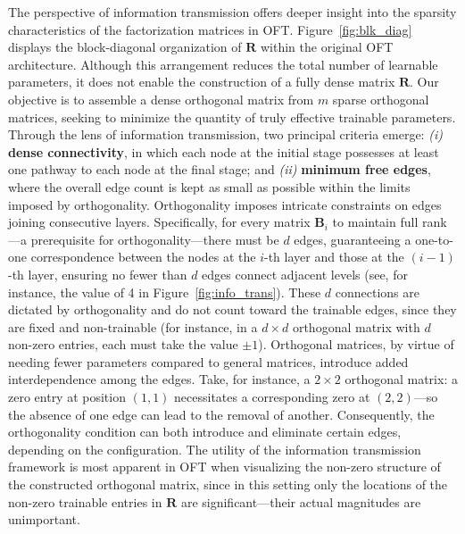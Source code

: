 The perspective of information transmission offers deeper insight into the sparsity characteristics of the factorization matrices in OFT. Figure~\ref{fig:blk_diag} displays the block-diagonal organization of $\bm{R}$ within the original OFT architecture. Although this arrangement reduces the total number of learnable parameters, it does not enable the construction of a fully dense matrix $\bm{R}$. Our objective is to assemble a dense orthogonal matrix from $m$ sparse orthogonal matrices, seeking to minimize the quantity of truly effective trainable parameters. Through the lens of information transmission, two principal criteria emerge: \emph{(i)} \textbf{dense connectivity}, in which each node at the initial stage possesses at least one pathway to each node at the final stage; and \emph{(ii)} \textbf{minimum free edges}, where the overall edge count is kept as small as possible within the limits imposed by orthogonality. Orthogonality imposes intricate constraints on edges joining consecutive layers. Specifically, for every matrix $\bm{B}_i$ to maintain full rank—a prerequisite for orthogonality—there must be $d$ edges, guaranteeing a one-to-one correspondence between the nodes at the $i$-th layer and those at the $(i-1)$-th layer, ensuring no fewer than $d$ edges connect adjacent levels (see, for instance, the value of 4 in Figure~\ref{fig:info_trans}). These $d$ connections are dictated by orthogonality and do not count toward the trainable edges, since they are fixed and non-trainable (for instance, in a $d\times d$ orthogonal matrix with $d$ non-zero entries, each must take the value $\pm 1$). Orthogonal matrices, by virtue of needing fewer parameters compared to general matrices, introduce added interdependence among the edges. Take, for instance, a $2\times 2$ orthogonal matrix: a zero entry at position $(1,1)$ necessitates a corresponding zero at $(2,2)$—so the absence of one edge can lead to the removal of another. Consequently, the orthogonality condition can both introduce and eliminate certain edges, depending on the configuration. The utility of the information transmission framework is most apparent in OFT when visualizing the non-zero structure of the constructed orthogonal matrix, since in this setting only the locations of the non-zero trainable entries in $\bm{R}$ are significant—their actual magnitudes are unimportant.

